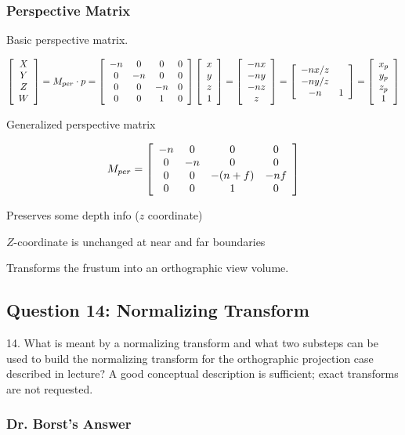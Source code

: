 \documentclass[11pt]{article}
\begin{document}
\begin{spacing}{1.2}
\subsubsection{Perspective Matrix}

Basic perspective matrix.  


$$
\left[
	\begin{array}{cccc}
		X \cr
		Y \cr
		Z \cr
		W \cr
	\end{array}
\right]
=
M_{per} \cdot p = 
\left[
	\begin{array}{cccc}
		-n & 0 & 0 & 0 \cr
		0 & -n & 0 & 0 \cr
		0 & 0 & -n & 0 \cr
		0 & 0 & 1 & 0 \cr
	\end{array}
\right]
\left[
	\begin{array}{cccc}
		x \cr y \cr z \cr 1
	\end{array}
\right]
= 
\left[
	\begin{array}{cccc}
		-nx \cr -ny \cr -nz \cr z
	\end{array}
\right]
=
\left[
	\begin{array}{cccc}
		-nx/z \cr -ny/z \cr -n & 1 \cr
	\end{array}
\right]
=
\left[
	\begin{array}{cccc}
		x_p \cr y_p \cr z_p \cr 1 \cr
	\end{array}
\right]
$$

Generalized perspective matrix

$$
M_{per} = 
\left[
	\begin{array}{cccc}
		-n & 0 & 0 & 0 \cr
		0 & -n & 0 & 0 \cr
		0 & 0 & -(n+f) & -nf \cr
		0 & 0 & 1 & 0 \cr
	\end{array}
\right]
$$

Preserves some depth info ($z$ coordinate)

$Z$-coordinate is unchanged at near and far boundaries

Transforms the frustum into an orthographic view volume.  

\subsection{Question 14:  Normalizing Transform}
14.  What is meant by a normalizing transform and what two substeps can be used to build the normalizing transform for the orthographic projection case described in lecture?  A good conceptual description is sufficient; exact transforms are not requested.

\subsubsection{Dr. Borst's Answer}


\end{spacing}
\end{document}
